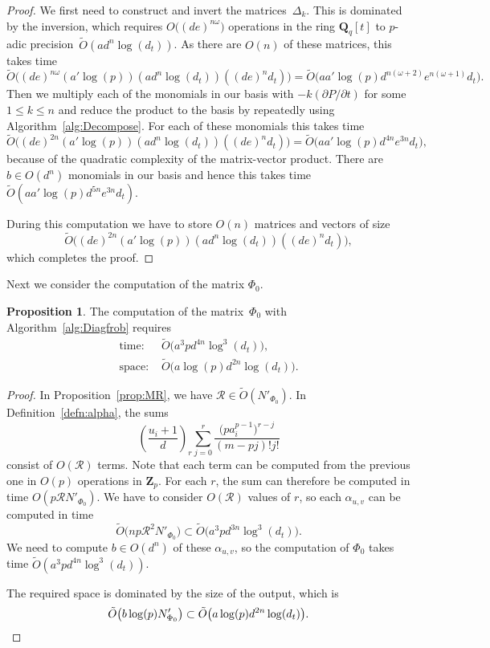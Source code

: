 \documentclass[a4paper,11pt]{article}
\numberwithin{equation}{section}
\newcommand{\ZZ}{\mathbf{Z}} %
\newcommand{\QQ}{\mathbf{Q}} %
\providecommand{\BigOh}{O}          %
\providecommand{\SoftOh}{\tilde{O}} %
\theoremstyle{definition}
\newtheorem{prop}[thm]{Proposition}
\begin{document}
\begin{proof}
We first need to construct and invert the matrices~$\Delta_k$.  This is 
dominated by the inversion, which requires $\BigOh\bigl((de)^{n \omega}\bigr)$ 
operations in the ring $\QQ_q[t]$ to $p$-adic 
precision~$\SoftOh(a d^n \log(d_t))$. As there are $\BigOh(n)$ of 
these matrices, this takes time 
\[
\SoftOh\bigl((de)^{n \omega} (a' \log(p)) (a d^n \log(d_t)) ((de)^n d_t)\bigr) = 
    \SoftOh\bigl(a a' \log(p) d^{n(\omega+2)} e^{n(\omega+1)} d_t\bigr).
\]
Then we multiply each of the monomials in our basis with 
$-k (\partial P / \partial t)$ for some $1 \leq k \leq n$ and 
reduce the product to the basis by repeatedly using 
Algorithm~\ref{alg:Decompose}.  For each of these monomials this 
takes time 
\[
\SoftOh\bigl((de)^{2n} (a' \log(p)) (a d^n \log(d_t)) ((de)^n d_t)\bigr) = 
    \SoftOh\bigl(a a' \log(p) d^{4n}e^{3n} d_t\bigr),
\]
because of the quadratic complexity of the matrix-vector product.  
There are $b \in \BigOh(d^n)$ monomials in our basis and hence this 
takes time $\SoftOh(a a' \log(p) d^{5n}e^{3n} d_t)$.

During this computation we have to store $\BigOh(n)$ matrices 
and vectors of size 
\[
\SoftOh\bigl((de)^{2n} (a' \log(p)) (a d^n \log(d_t)) ((de)^n d_t)\bigr),
\] 
which completes the proof.
\end{proof}

Next we consider the computation of the matrix $\Phi_0$.

\begin{prop} \label{prop:complexityPhi0}
The computation of the matrix~$\Phi_0$ with Algorithm~\ref{alg:Diagfrob} requires
\begin{align*}
\mbox{time: }  & \SoftOh\bigl(a^3 p d^{4n} \log^3(d_t)\bigr), \\
\mbox{space: } & \SoftOh\bigl(a \log(p) d^{2n} \log(d_t)\bigr).
\end{align*}
\end{prop}

\begin{proof}
In Proposition~\ref{prop:MR}, we have $\mathcal{R} \in \SoftOh(N'_{\Phi_0})$.
In Definition~\ref{defn:alpha}, the sums
\begin{equation*} \label{eqn:ifactor}
\left(\frac{u_i+1}{d} \right)_r \sum_{j=0}^{r} \frac{\bigl(p a_i^{p-1}\bigr)^{r-j}}{(m-pj)!j!}
\end{equation*}
consist of $\BigOh(\mathcal{R})$ terms. Note that each term can be computed from the previous one in $\BigOh(p)$ operations 
in $\ZZ_p$. For each $r$, the sum can therefore be computed in time $\BigOh(p \mathcal{R} N'_{\Phi_0})$. We have to consider
$\BigOh(\mathcal{R})$ values of $r$, so each $\alpha_{u,v}$ can be computed in time 
\[
\SoftOh\bigl(np \mathcal{R}^2 N'_{\Phi_0}\bigr) \subset \SoftOh\bigl(a^3 p d^{3n} \log^3(d_t)\bigr).
\]
We need to compute $b \in \BigOh(d^n)$ of these $\alpha_{u,v}$, so the computation of $\Phi_0$
takes time $\SoftOh(a^3 p d^{4n} \log^3(d_t))$. 

The required space is dominated by the size of the output, which is
\[
\SoftOh\bigl(b \log(p) N'_{\Phi_0}\bigr) \subset \SoftOh\bigl(a \log(p) d^{2n} \log(d_t)\bigr). \qedhere
\]
\end{proof}
\end{document}

